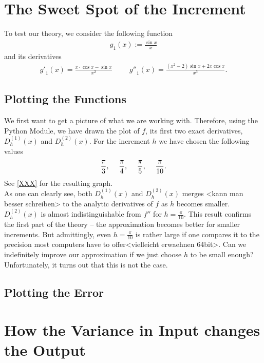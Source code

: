\section{The Sweet Spot of the Increment}
To test our theory, we consider the following function
\begin{align*}
    g_1(x) := \frac{\sin{x}}{x} \text{}
\end{align*}
and its derivatives
\begin{align*}
    {g'}_{1}(x) = \frac{x \cdot \cos{x} - \sin{x}}{x^2} \hspace{1cm} {g''}_{1}(x) = \frac{(x^2 - 2) \sin{x} + 2 x \cos{x}}{x^3} \text{.}
\end{align*}

\subsection{Plotting the Functions} %

We first want to get a picture of what we are working with. Therefore, using the Python Module, we have drawn the plot of \(f\), its first two exact derivatives, \(D^{(1)}_h(x)\) and \(D^{(2)}_h(x)\). For the increment \(h\) we have chosen the following values
\begin{align*}
    \frac{\pi}{3} \text{,} \hspace{0.5cm} \frac{\pi}{4} \text{,} \hspace{0.5cm} \frac{\pi}{5} \text{,} \hspace{0.5cm} \frac{\pi}{10} \text{.}
\end{align*}
See \ref{XXX} for the resulting graph. \\
As one can clearly see, both \(D^{(1)}_h(x)\) and \(D^{(2)}_h(x)\) merges <kann man besser schreiben> to the analytic derivatives of \(f\) as \(h\) becomes smaller. \(D^{(2)}_h(x)\) is almost indistinguishable from \(f''\) for \(h = \frac{\pi}{10}\). This result confirms the first part of the theory -- the approximation becomes better for smaller increments. But admittingly, even \(h = \frac{\pi}{10}\) is rather large if one compares it to the precision most computers have to offer<vielleicht erwaehnen 64bit>. Can we indefinitely improve our approximation if we just choose \(h\) to be small enough? Unfortunately, it turns out that this is not the case.
\subsection{Plotting the Error}

\section{How the Variance in Input changes the Output}